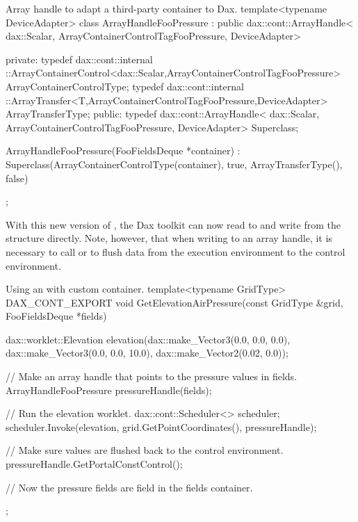 \begin{daxexample}{Array handle to adapt a third-party container to Dax.}
template<typename DeviceAdapter>
class ArrayHandleFooPressure
    : public dax::cont::ArrayHandle<
                dax::Scalar, ArrayContainerControlTagFooPressure, DeviceAdapter>
{
private:
  typedef dax::cont::internal
      ::ArrayContainerControl<dax::Scalar,ArrayContainerControlTagFooPressure>
      ArrayContainerControlType;
  typedef dax::cont::internal
      ::ArrayTransfer<T,ArrayContainerControlTagFooPressure,DeviceAdapter>
      ArrayTransferType;
public:
  typedef dax::cont::ArrayHandle<
      dax::Scalar, ArrayContainerControlTagFooPressure, DeviceAdapter> Superclass;

  ArrayHandleFooPressure(FooFieldsDeque *container)
    : Superclass(ArrayContainerControlType(container), true, ArrayTransferType(), false)
  {  }
};
\end{daxexample}

With this new version of , the Dax toolkit can
now read to and write from the  structure
directly. Note, however, that when writing to an array handle, it is
necessary to call  or
 to flush data from the execution
environment to the control environment. 

\begin{daxexample}{Using an  with custom container.}
template<typename GridType>
DAX_CONT_EXPORT
void GetElevationAirPressure(const GridType &grid, FooFieldsDeque *fields)
{
  dax::worklet::Elevation elevation(dax::make_Vector3(0.0, 0.0, 0.0),
                                    dax::make_Vector3(0.0, 0.0, 10.0),
                                    dax::make_Vector2(0.02, 0.0));

  // Make an array handle that points to the pressure values in fields.
  ArrayHandleFooPressure pressureHandle(fields);

  // Run the elevation worklet.
  dax::cont::Scheduler<> scheduler;
  scheduler.Invoke(elevation, grid.GetPointCoordinates(), pressureHandle);

  // Make sure values are flushed back to the control environment.
  pressureHandle.GetPortalConstControl();

  // Now the pressure fields are field in the fields container.
};
\end{daxexample}


